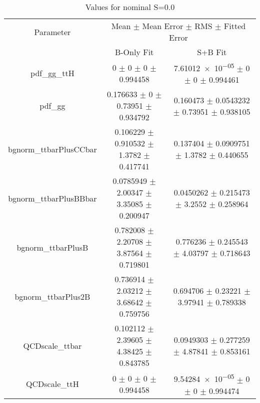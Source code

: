 \begin{table}
\centering
\caption{Values for nominal S=0.0}
\begin{tabular}{ccc}
\toprule
Parameter & \multicolumn{2}{c}{Mean $\pm$ Mean Error $\pm$ RMS $\pm$ Fitted Error}\\
 & B-Only Fit & S+B Fit\\
\midrule
pdf\_gg\_ttH & \num{0} $\pm$ \num{0} $\pm$ \num{0} $\pm$ \num{0.994458} & \num{7.61012e-05} $\pm$ \num{0} $\pm$ \num{0} $\pm$ \num{0.994461}\\
pdf\_gg & \num{0.176633} $\pm$ \num{0} $\pm$ \num{0.73951} $\pm$ \num{0.934792} & \num{0.160473} $\pm$ \num{0.0543232} $\pm$ \num{0.73951} $\pm$ \num{0.938105}\\
bgnorm\_ttbarPlusCCbar & \num{0.106229} $\pm$ \num{0.910532} $\pm$ \num{1.3782} $\pm$ \num{0.417741} & \num{0.137404} $\pm$ \num{0.0909751} $\pm$ \num{1.3782} $\pm$ \num{0.440655}\\
bgnorm\_ttbarPlusBBbar & \num{0.0785949} $\pm$ \num{2.00347} $\pm$ \num{3.35085} $\pm$ \num{0.200947} & \num{0.0450262} $\pm$ \num{0.215473} $\pm$ \num{3.2552} $\pm$ \num{0.258964}\\
bgnorm\_ttbarPlusB & \num{0.782008} $\pm$ \num{2.20708} $\pm$ \num{3.87564} $\pm$ \num{0.719801} & \num{0.776236} $\pm$ \num{0.245543} $\pm$ \num{4.03797} $\pm$ \num{0.718643}\\
bgnorm\_ttbarPlus2B & \num{0.736914} $\pm$ \num{2.03212} $\pm$ \num{3.68642} $\pm$ \num{0.759756} & \num{0.694706} $\pm$ \num{0.23221} $\pm$ \num{3.97941} $\pm$ \num{0.789338}\\
QCDscale\_ttbar & \num{0.102112} $\pm$ \num{2.39605} $\pm$ \num{4.38425} $\pm$ \num{0.843785} & \num{0.0949303} $\pm$ \num{0.277259} $\pm$ \num{4.87841} $\pm$ \num{0.853161}\\
QCDscale\_ttH & \num{0} $\pm$ \num{0} $\pm$ \num{0} $\pm$ \num{0.994458} & \num{9.54284e-05} $\pm$ \num{0} $\pm$ \num{0} $\pm$ \num{0.994474}\\
\bottomrule
\end{tabular}
\end{table}